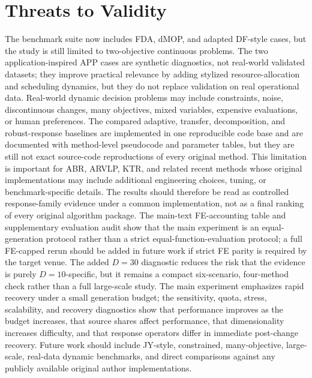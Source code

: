 \documentclass[1p,times]{elsarticle}
\begin{document}
\section{Threats to Validity}
The benchmark suite now includes FDA, dMOP, and adapted DF-style cases, but the study is still limited to two-objective continuous problems. The two application-inspired APP cases are synthetic diagnostics, not real-world validated datasets; they improve practical relevance by adding stylized resource-allocation and scheduling dynamics, but they do not replace validation on real operational data. Real-world dynamic decision problems may include constraints, noise, discontinuous changes, many objectives, mixed variables, expensive evaluations, or human preferences. The compared adaptive, transfer, decomposition, and robust-response baselines are implemented in one reproducible code base and are documented with method-level pseudocode and parameter tables, but they are still not exact source-code reproductions of every original method. This limitation is important for ABR, ARVLP, KTR, and related recent methods whose original implementations may include additional engineering choices, tuning, or benchmark-specific details. The results should therefore be read as controlled response-family evidence under a common implementation, not as a final ranking of every original algorithm package. The main-text FE-accounting table and supplementary evaluation audit show that the main experiment is an equal-generation protocol rather than a strict equal-function-evaluation protocol; a full FE-capped rerun should be added in future work if strict FE parity is required by the target venue. The added $D=30$ diagnostic reduces the risk that the evidence is purely $D=10$-specific, but it remains a compact six-scenario, four-method check rather than a full large-scale study. The main experiment emphasizes rapid recovery under a small generation budget; the sensitivity, quota, stress, scalability, and recovery diagnostics show that performance improves as the budget increases, that source shares affect performance, that dimensionality increases difficulty, and that response operators differ in immediate post-change recovery. Future work should include JY-style, constrained, many-objective, large-scale, real-data dynamic benchmarks, and direct comparisons against any publicly available original author implementations.
\end{document}
